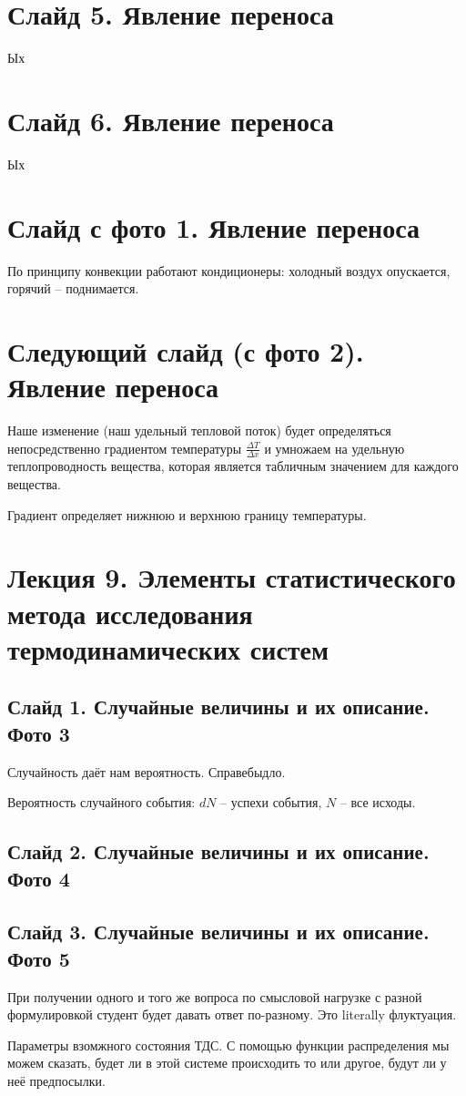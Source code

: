 \documentclass[12pt]{article}
\begin{document}
\section{Слайд 5. Явление переноса}
Ых
\section{Слайд 6. Явление переноса}
Ых
\section{Слайд с фото 1. Явление переноса}
\par По принципу конвекции работают кондиционеры: холодный воздух опускается, горячий -- поднимается.
\par 
\section{Следующий слайд (с фото 2). Явление переноса}
\par Наше изменение (наш удельный тепловой поток) будет определяться непосредственно градиентом температуры $\frac{\Delta T}{\Delta x}$ и умножаем на удельную теплопроводность вещества, которая является табличным значением для каждого вещества.
\par Градиент определяет нижнюю и верхнюю границу температуры.
\section{Лекция 9. Элементы статистического метода исследования термодинамических систем}
\subsection{Слайд 1. Случайные величины и их описание. Фото 3}
\par Случайность даёт нам вероятность. Справебыдло.
\par Вероятность случайного события: $dN$ -- успехи события, $N$ -- все исходы.
\subsection{Слайд 2. Случайные величины и их описание. Фото 4}
\subsection{Слайд 3. Случайные величины и их описание. Фото 5}
\par При получении одного и того же вопроса по смысловой нагрузке с разной формулировкой студент будет давать ответ по-разному. Это literally флуктуация.
\par Параметры взомжного состояния ТДС. С помощью функции распределения мы можем сказать, будет ли в этой системе происходить то или другое, будут ли у неё предпосылки. 
\end{document}
